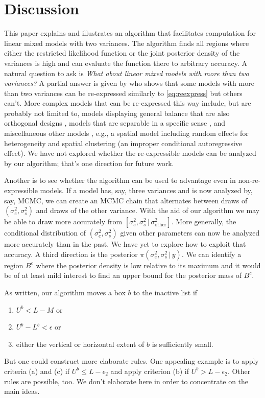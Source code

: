 \documentclass{report}
\newcommand{\sigssq}{\sigma_s^2}
\newcommand{\sigesq}{\sigma_e^2}
\newcommand{\g}{\,|\,}
\begin{document}
\section{Discussion}
This paper explains and illustrates an algorithm that facilitates computation for linear mixed models with two variances. The algorithm finds all regions where either the restricted likelihood function or the joint posterior density of the variances is high and can evaluate the function there to arbitrary accuracy.  A natural question to ask is \emph{What about linear mixed models with more than two variances?}  A partial answer is given by \cite{hodges:2013} who shows that some models with more than two variances can be re-expressed similarly to \eqref{eq:reexpress} but others can't.  More complex models that can be re-expressed this way include, but are probably not limited to, models displaying general balance that are also orthogonal designs \citep[all balanced ANOVAs plus other models;][]{houtman_speed:1983}, models that are separable in a specific sense \citep[Section 17.1.5]{hodges:2013}, and miscellaneous other models \citep[Section 17.1.5]{hodges:2013}, e.g., a spatial model including random effects for heterogeneity and spatial clustering (an improper conditional autoregressive effect). We have not explored whether the re-expressible models can be analyzed by our algorithm; that's one direction for future work.  

Another is to see whether the algorithm can be used to advantage even in non-re-expressible models.  If a model has, say, three variances and is now analyzed by, say, MCMC, we can create an MCMC chain that alternates between draws of $(\sigesq,\sigssq)$ and draws of the other variance.  With the aid of our algorithm we may be able to draw more accurately from $[\sigesq,\sigssq\g \sigma^2_\text{other}]$.  More generally, the conditional distribution of $(\sigesq,\sigssq)$ given other parameters can now be analyzed more accurately than in the past.  We have yet to explore how to exploit that accuracy.  A third direction is the posterior $\pi(\sigesq,\sigssq\g y)$.  We can identify a region $B^c$ where the posterior density is low relative to its maximum and it would be of at least mild interest to find an upper bound for the posterior mass of $B^c$.

As written, our algorithm moves a box $b$ to the inactive list if
\begin{enumerate}[label=(\alph*)]
\item $U^b < L-M$ or
\item $U^b - L^b < \epsilon$ or
\item either the vertical or horizontal extent of $b$ is sufficiently small.
\end{enumerate}
But one could construct more elaborate rules.  One appealing example is to apply criteria (a) and (c) if $U^b \le L-\epsilon_2$ and apply criterion (b) if $U^b > L-\epsilon_2$.  Other rules are possible, too.  We don't elaborate here in order to concentrate on the main ideas.
\end{document}
